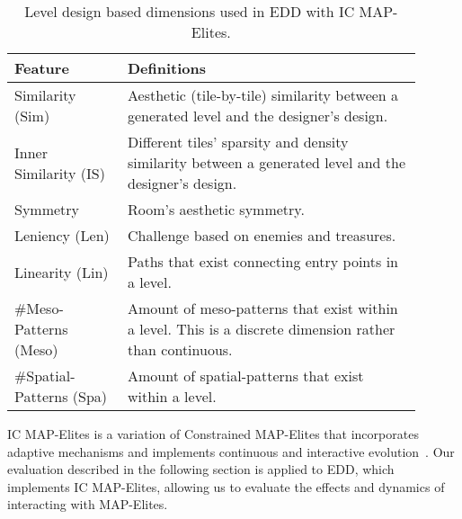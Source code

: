 \begin{table}[]
\begin{tabular}{p{0.25\linewidth}| p{0.65\linewidth}}
Feature          & Definitions                                                                                                                  \\ \hline
Similarity (Sim)       & Aesthetic (tile-by-tile) similarity between a generated level and the designer's design.                         \\ \hline
Inner Similarity (IS) & Different tiles' sparsity and density similarity between a generated level and the designer's design.     \\ \hline
Symmetry         & Room's aesthetic symmetry.                                                                                 \\ \hline
Leniency (Len)        & Challenge based on enemies and treasures.\\ \hline
Linearity (Lin)       & Paths that exist connecting entry points in a level.  \\ \hline
\#Meso-Patterns (Meso) & Amount of meso-patterns that exist within a level. This is a discrete dimension rather than continuous.\\ \hline
\#Spatial-Patterns (Spa) & Amount of spatial-patterns that exist within a level. \\ \hline
\end{tabular}
\caption{Level design based dimensions used in EDD with IC MAP-Elites.}
\label{tab:dimensions}
\end{table}

IC MAP-Elites is a variation of Constrained MAP-Elites that incorporates adaptive mechanisms and implements continuous and interactive evolution~\cite{p9Alvarez2020-ICMAPE}. Our evaluation described in the following section is applied to EDD, which implements IC MAP-Elites, allowing us to evaluate the effects and dynamics of interacting with MAP-Elites. 


